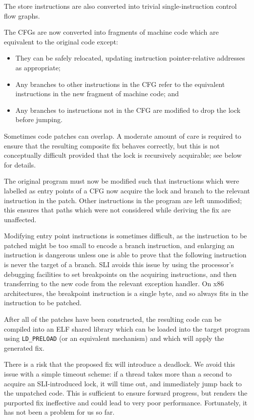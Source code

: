 \documentclass[10pt,letter,twocolumn]{sigplanconf}
\begin{document}
The store instructions are also converted into trivial
single-instruction control flow graphs.

The CFGs are now converted into fragments of machine code which are
equivalent to the original code except:

\begin{itemize}
\item They can be safely relocated, updating instruction pointer-relative
  addresses as appropriate;
\item Any branches to other instructions in the CFG refer to the
  equivalent instructions in the new fragment of machine code; and
\item Any branches to instructions not in the CFG are modified to
  drop the lock before jumping.
\end{itemize}

\noindent
Sometimes code patches can overlap.  A moderate amount of care is
required to ensure that the resulting composite fix behaves correctly,
but this is not conceptually difficult provided that the lock is
recursively acquirable; see below for details.

The original program must now be modified such that instructions which
were labelled as entry points of a CFG now acquire the lock and branch
to the relevant instruction in the patch.  Other instructions in the
program are left unmodified; this ensures that paths which were not
considered while deriving the fix are unaffected.

Modifying entry point instructions is sometimes difficult, as the
instruction to be patched might be too small to encode a branch
instruction, and enlarging an instruction is dangerous unless one is
able to prove that the following instruction is never the target of a
branch.  SLI avoids this issue by using the processor's debugging
facilities to set breakpoints on the acquiring instructions, and then
transferring to the new code from the relevant exception handler.  On
x86 architectures, the breakpoint instruction is a single byte, and so
always fits in the instruction to be patched.

After all of the patches have been constructed, the resulting code can
be compiled into an ELF shared library which can be loaded into the
target program using \verb|LD_PRELOAD| (or an equivalent mechanism)
and which will apply the generated fix.  

There is a risk that the proposed fix will introduce a deadlock.  We
avoid this issue with a simple timeout scheme: if a thread takes more
than a second to acquire an SLI-introduced lock, it will time out, and
immediately jump back to the unpatched code.  This is sufficient to
ensure forward progress, but renders the purported fix ineffective and
could lead to very poor performance.  Fortunately, it has not been a
problem for us so far.
\end{document}
